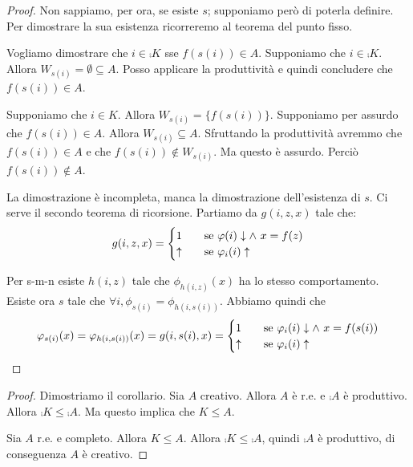 \begin{proof}
    Non sappiamo, per ora, se esiste $s$; supponiamo però di poterla definire. Per dimostrare la
    sua esistenza ricorreremo al teorema del punto fisso.

    Vogliamo dimostrare che $i \in \comp{K}$ sse $f(s(i)) \in A$. Supponiamo che $i \in \comp{K}$.
    Allora $W_{s(i)} = \emptyset \subseteq A$. Posso applicare la produttività e quindi concludere
    che $f(s(i)) \in A$.

    Supponiamo che $i \in K$. Allora $W_{s(i)} = \{f(s(i))\}$. Supponiamo per assurdo che $f(s(i)) \in A$.
    Allora $W_{s(i)} \subseteq A$. Sfruttando la produttività avremmo che $f(s(i)) \in A$ e che
    $f(s(i)) \notin W_{s(i)}$. Ma questo è assurdo. Perciò $f(s(i)) \notin A$.

    La dimostrazione è incompleta, manca la dimostrazione dell'esistenza di $s$. Ci serve il secondo
    teorema di ricorsione. Partiamo da $g(i,z,x)$ tale che:
    \begin{equation*}
        g(i,z,x) =
        \begin{cases}
            1 \quad &\text{se $\varphi(i) \downarrow \land$ $x = f(z)$} \\
            \uparrow \quad &\text{se $\varphi_{i}(i) \uparrow$}
        \end{cases}
    \end{equation*}
    
    Per s-m-n esiste $h(i,z)$ tale che $\phi_{h(i,z)}(x)$ ha lo stesso comportamento. Esiste ora $s$ tale che
    $\forall i, \phi_{s(i)} = \phi_{h(i,s(i))}$. Abbiamo quindi che
    \begin{equation*}
        \varphi_{s(i)}(x) = \varphi_{h(i,s(i))}(x) = g(i,s(i),x) =
        \begin{cases}
            1 \quad &\text{se $\varphi_{i}(i) \downarrow \land$ $x = f(s(i))$} \\
            \uparrow \quad &\text{se $\varphi_{i}(i) \uparrow$}
        \end{cases}
    \end{equation*}
\end{proof}

\begin{proof}
    Dimostriamo il corollario. Sia $A$ creativo. Allora $A$ è r.e. e $\comp{A}$ è produttivo. Allora
    $\comp{K} \leq \comp{A}$. Ma questo implica che $K \leq A$.

    Sia $A$ r.e. e completo. Allora $K \leq A$. Allora $\comp{K} \leq \comp{A}$, quindi $\comp{A}$ è
    produttivo, di conseguenza $A$ è creativo.
\end{proof}

